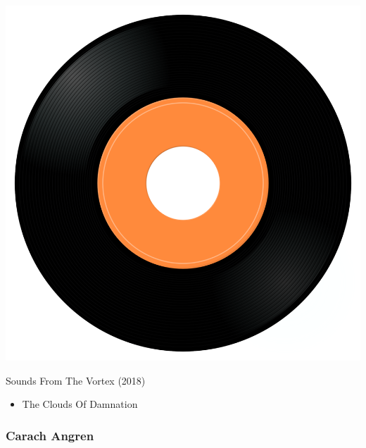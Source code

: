 \begin{minipage}[t]{0.25\textwidth}
\captionsetup{type=figure}
\includegraphics[width=\textwidth]{Images/cover.png}
\caption*{Sounds From The Vortex (2018)}
\end{minipage}
\begin{minipage}[t]{0.25\textwidth}\vspace{0pt}
\begin{itemize}[nosep,leftmargin=1em,labelwidth=*,align=left]
	\setlength{\itemsep}{0pt}
	\item The Clouds Of Damnation
\end{itemize}
\end{minipage}

\subsubsection{Carach Angren}

